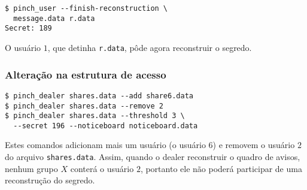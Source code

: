 \documentclass[10pt,twocolumn]{article}
\begin{document}
\begin{verbatim}
$ pinch_user --finish-reconstruction \
  message.data r.data
Secret: 189
\end{verbatim}

O usuário $1$, que detinha \verb"r.data", pôde agora reconstruir o segredo.

\subsubsection{Alteração na estrutura de acesso}

\begin{verbatim}
$ pinch_dealer shares.data --add share6.data
$ pinch_dealer shares.data --remove 2
$ pinch_dealer shares.data --threshold 3 \
  --secret 196 --noticeboard noticeboard.data
\end{verbatim}

Estes comandos adicionam mais um usuário (o usuário $6$)
e removem o usuário $2$ do arquivo \verb"shares.data".
Assim,
quando o dealer reconstruir o quadro de avisos,
nenhum grupo $X$ conterá o usuário $2$,
portanto ele não poderá participar de uma reconstrução do segredo.



\end{document}
